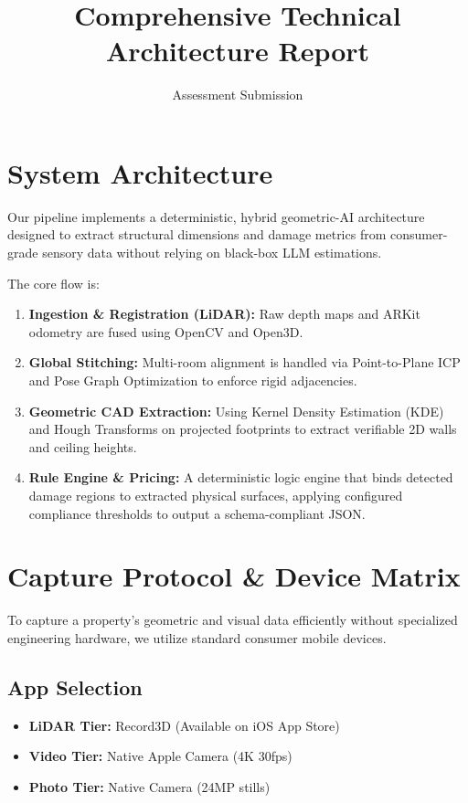 \documentclass[11pt,a4paper]{article}
\title{\textbf{Comprehensive Technical Architecture Report}}
\author{Assessment Submission}
\date{}
\begin{document}
\maketitle

\section{System Architecture}
Our pipeline implements a deterministic, hybrid geometric-AI architecture designed to extract structural dimensions and damage metrics from consumer-grade sensory data without relying on black-box LLM estimations.

The core flow is:
\begin{enumerate}[label=\arabic*.]
    \item \textbf{Ingestion \& Registration (LiDAR):} Raw depth maps and ARKit odometry are fused using OpenCV and Open3D.
    \item \textbf{Global Stitching:} Multi-room alignment is handled via Point-to-Plane ICP and Pose Graph Optimization to enforce rigid adjacencies.
    \item \textbf{Geometric CAD Extraction:} Using Kernel Density Estimation (KDE) and Hough Transforms on projected footprints to extract verifiable 2D walls and ceiling heights.
    \item \textbf{Rule Engine \& Pricing:} A deterministic logic engine that binds detected damage regions to extracted physical surfaces, applying configured compliance thresholds to output a schema-compliant JSON.
\end{enumerate}

\section{Capture Protocol \& Device Matrix}
To capture a property's geometric and visual data efficiently without specialized engineering hardware, we utilize standard consumer mobile devices.

\subsection{App Selection}
\begin{itemize}
    \item \textbf{LiDAR Tier:} Record3D (Available on iOS App Store)
    \item \textbf{Video Tier:} Native Apple Camera (4K 30fps)
    \item \textbf{Photo Tier:} Native Camera (24MP stills)
\end{itemize}
\end{document}
